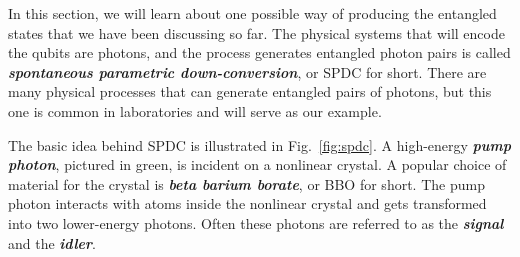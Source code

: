 In this section, we will learn about one possible way of producing the entangled states that we have been discussing so far.
The physical systems that will encode the qubits are photons, and the process generates entangled photon pairs is called \textbf{\emph{spontaneous parametric down-conversion}}, or SPDC for short. There are many physical processes that can generate entangled pairs of photons, but this one is common in laboratories and will serve as our example.

The basic idea behind SPDC is illustrated in Fig.~\ref{fig:spdc}.
A high-energy \textbf{\emph{pump photon}}, pictured in green, is incident on a nonlinear crystal.
A popular choice of material for the crystal is \textbf{\emph{beta barium borate}}, or BBO for short.
The pump photon interacts with atoms inside the nonlinear crystal and gets transformed into two lower-energy photons.
Often these photons are referred to as the \textbf{\emph{signal}} and the \textbf{\emph{idler}}.

